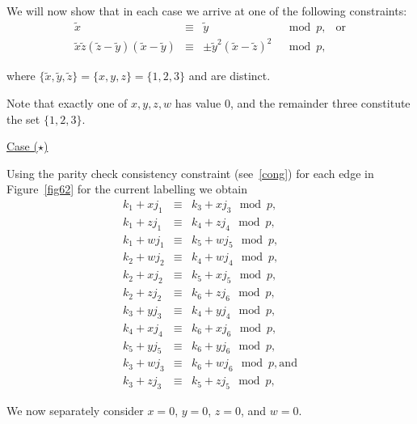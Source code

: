 We will now show that in each case we arrive at one of the following
constraints:
\begin{equation}\label{consti}
\begin{array}{ccccc}
\tilde{x} &\equiv& \tilde{y} &\mod p, &\text{or} \\
\tilde{x}\tilde{z}(\tilde{z}-\tilde{y})(\tilde{x}-\tilde{y})
&\equiv& \pm \tilde{y}^2(\tilde{x}-\tilde{z})^2  &\mod p, &{}
\end{array}
\end{equation}

where $\{\tilde{x},\tilde{y},\tilde{z}\} = \{x,y,z\}= \{1,2,3\}$ and
are distinct.

Note that exactly one of $x,y,z,w$ has value $0$, and the remainder
three constitute the set $\{1,2,3\}$.

\underline{Case ($\star$)}

Using the parity check consistency constraint (see~\eqref{cong}) for
each edge in Figure~\ref{fig62} for the current labelling we obtain
\begin{subequations}\begin{eqnarray}
\label{ar62a}k_1+xj_1 &\equiv& k_3+xj_3 \mod p, \\
\label{ar62b}k_1+zj_1 &\equiv& k_4+zj_4 \mod p, \\
\label{ar62c}k_1+wj_1 &\equiv& k_5+wj_5 \mod p, \\
\label{ar62d}k_2+wj_2 &\equiv& k_4+wj_4 \mod p, \\
\label{ar62e}k_2+xj_2 &\equiv& k_5+xj_5 \mod p, \\
\label{ar62f}k_2+zj_2 &\equiv& k_6+zj_6 \mod p, \\
\label{ar62g}k_3+yj_3 &\equiv& k_4+yj_4 \mod p, \\
\label{ar62h}k_4+xj_4 &\equiv& k_6+xj_6 \mod p, \\
\label{ar62i}k_5+yj_5 &\equiv& k_6+yj_6 \mod p, \\
\label{ar62j}k_3+wj_3 &\equiv& k_6+wj_6 \mod p,\text{and} \\
\label{ar62k}k_3+zj_3 &\equiv& k_5+zj_5 \mod p,
\end{eqnarray}\end{subequations}



We now separately consider $x=0$, $y=0$, $z=0$, and $w=0$.

